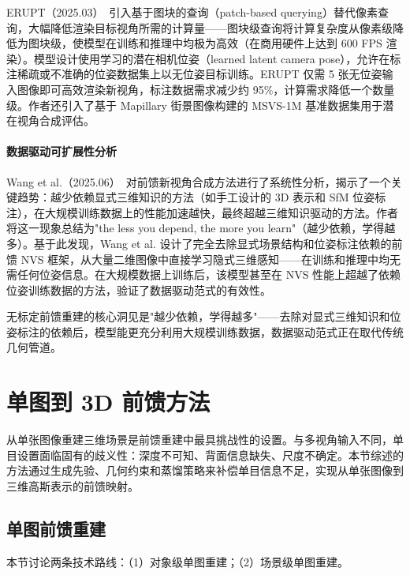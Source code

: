 ERUPT（2025.03）~\cite{2503_24374}引入基于图块的查询（patch-based querying）替代像素查询，大幅降低渲染目标视角所需的计算量——图块级查询将计算复杂度从像素级降低为图块级，使模型在训练和推理中均极为高效（在商用硬件上达到 600 FPS 渲染）。模型设计使用学习的潜在相机位姿（learned latent camera pose），允许在标注稀疏或不准确的位姿数据集上以无位姿目标训练。ERUPT 仅需 5 张无位姿输入图像即可高效渲染新视角，标注数据需求减少约 95\%，计算需求降低一个数量级。作者还引入了基于 Mapillary 街景图像构建的 MSVS-1M 基准数据集用于潜在视角合成评估。

\paragraph{数据驱动可扩展性分析}

Wang et al.（2025.06）~\cite{2506_09885}对前馈新视角合成方法进行了系统性分析，揭示了一个关键趋势：越少依赖显式三维知识的方法（如手工设计的 3D 表示和 SfM 位姿标注），在大规模训练数据上的性能加速越快，最终超越三维知识驱动的方法。作者将这一现象总结为"the less you depend, the more you learn"（越少依赖，学得越多）。基于此发现，Wang et al. 设计了完全去除显式场景结构和位姿标注依赖的前馈 NVS 框架，从大量二维图像中直接学习隐式三维感知——在训练和推理中均无需任何位姿信息。在大规模数据上训练后，该模型甚至在 NVS 性能上超越了依赖位姿训练数据的方法，验证了数据驱动范式的有效性。

\begin{takeaway}
无标定前馈重建的核心洞见是"越少依赖，学得越多"——去除对显式三维知识和位姿标注的依赖后，模型能更充分利用大规模训练数据，数据驱动范式正在取代传统几何管道。
\end{takeaway}

\section{单图到 3D 前馈方法}
\label{sec:13_3}

从单张图像重建三维场景是前馈重建中最具挑战性的设置。与多视角输入不同，单目设置面临固有的歧义性：深度不可知、背面信息缺失、尺度不确定。本节综述的方法通过生成先验、几何约束和蒸馏策略来补偿单目信息不足，实现从单张图像到三维高斯表示的前馈映射。

\subsection{单图前馈重建}
\label{ss:13_3a}

本节讨论两条技术路线：（1）对象级单图重建；（2）场景级单图重建。

